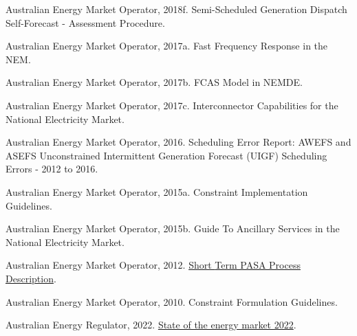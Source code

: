 \documentclass[12pt,a4paper,]{report}
\newlength{\cslhangindent}
\newenvironment{CSLReferences}[2] %
 {%
  \setlength{\parindent}{0pt}
  \ifodd #1 \everypar{\setlength{\hangindent}{\cslhangindent}}\ignorespaces\fi
  \ifnum #2 > 0
  \setlength{\parskip}{#2\baselineskip}
  \fi
 }%
 {}
\begin{document}
\begin{CSLReferences}{1}{0}
\leavevmode{}%
Australian Energy Market Operator, 2018f. Semi-{Scheduled Generation
Dispatch Self-Forecast} - {Assessment Procedure}.

\leavevmode{}%
Australian Energy Market Operator, 2017a. Fast {Frequency Response} in
the {NEM}.

\leavevmode{}%
Australian Energy Market Operator, 2017b. {FCAS Model} in {NEMDE}.

\leavevmode{}%
Australian Energy Market Operator, 2017c. Interconnector {Capabilities}
for the {National Electricity Market}.

\leavevmode{}%
Australian Energy Market Operator, 2016. Scheduling {Error Report}:
{AWEFS} and {ASEFS Unconstrained Intermittent Generation Forecast}
({UIGF}) {Scheduling Errors} - 2012 to 2016.

\leavevmode{}%
Australian Energy Market Operator, 2015a. Constraint {Implementation
Guidelines}.

\leavevmode{}%
Australian Energy Market Operator, 2015b. Guide {To Ancillary Services}
in the {National Electricity Market}.

\leavevmode{}%
Australian Energy Market Operator, 2012.
\href{https://www.aemo.com.au/-/media/files/electricity/nem/planning_and_forecasting/pasa/stpasa-process-description.pdf}{Short
{Term PASA Process Description}}.

\leavevmode{}%
Australian Energy Market Operator, 2010. Constraint {Formulation
Guidelines}.

\leavevmode{}%
Australian Energy Regulator, 2022.
\href{https://www.aer.gov.au/system/files/State\%20of\%20the\%20energy\%20market\%202022\%20-\%20Full\%20report.pdf}{State
of the energy market 2022}.


\end{CSLReferences}
\end{document}
